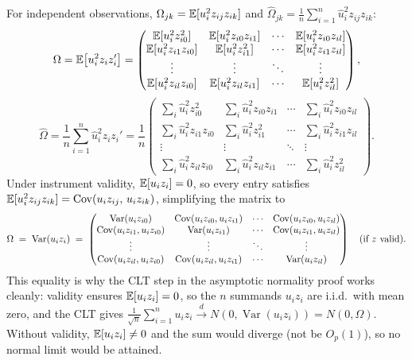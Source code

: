 \begin{remark}
	For independent observations, $\Omega_{jk}=\mathbb{E}[u_i^2 z_{ij}z_{ik}]$ and $\hat\Omega_{jk}=\frac{1}{n}\sum_{i=1}^n\hat u_i^2 z_{ij}z_{ik}$:
	\[
		\Omega = \mathbb{E}\!\left[u_i^2 z_iz_i'\right] =
		\begin{pmatrix}
			\mathbb{E}[u_i^2 z_{i0}^2]     & \mathbb{E}[u_i^2 z_{i0}z_{i1}] & \cdots & \mathbb{E}[u_i^2 z_{i0}z_{il}] \\
			\mathbb{E}[u_i^2 z_{i1}z_{i0}] & \mathbb{E}[u_i^2 z_{i1}^2]     & \cdots & \mathbb{E}[u_i^2 z_{i1}z_{il}] \\
			\vdots                  & \vdots                  & \ddots & \vdots                  \\
			\mathbb{E}[u_i^2 z_{il}z_{i0}] & \mathbb{E}[u_i^2 z_{il}z_{i1}] & \cdots & \mathbb{E}[u_i^2 z_{il}^2]
		\end{pmatrix},
	\]
	\[
		\hat\Omega = \frac{1}{n}\sum_{i=1}^n \hat u_i^2 z_iz_i' =
		\frac{1}{n}
		\begin{pmatrix}
			\textstyle\sum_i \hat u_i^2 z_{i0}^2     & \textstyle\sum_i \hat u_i^2 z_{i0}z_{i1} & \cdots & \textstyle\sum_i \hat u_i^2 z_{i0}z_{il} \\
			\textstyle\sum_i \hat u_i^2 z_{i1}z_{i0} & \textstyle\sum_i \hat u_i^2 z_{i1}^2     & \cdots & \textstyle\sum_i \hat u_i^2 z_{i1}z_{il} \\
			\vdots                                    & \vdots                                    & \ddots & \vdots                                   \\
			\textstyle\sum_i \hat u_i^2 z_{il}z_{i0} & \textstyle\sum_i \hat u_i^2 z_{il}z_{i1} & \cdots & \textstyle\sum_i \hat u_i^2 z_{il}^2
		\end{pmatrix}.
	\]
	Under instrument validity, $\mathbb{E}[u_iz_i]=0$, so every entry satisfies $\mathbb{E}[u_i^2 z_{ij}z_{ik}] = \operatorname{Cov}(u_iz_{ij},\,u_iz_{ik})$, simplifying the matrix to
	\[
		\Omega \;=\; \operatorname{Var}(u_i z_i) \;=\;
		\begin{pmatrix}
			\operatorname{Var}(u_iz_{i0})           & \operatorname{Cov}(u_iz_{i0},u_iz_{i1}) & \cdots & \operatorname{Cov}(u_iz_{i0},u_iz_{il}) \\
			\operatorname{Cov}(u_iz_{i1},u_iz_{i0}) & \operatorname{Var}(u_iz_{i1})           & \cdots & \operatorname{Cov}(u_iz_{i1},u_iz_{il}) \\
			\vdots                    & \vdots                    & \ddots & \vdots                    \\
			\operatorname{Cov}(u_iz_{il},u_iz_{i0}) & \operatorname{Cov}(u_iz_{il},u_iz_{i1}) & \cdots & \operatorname{Var}(u_iz_{il})
		\end{pmatrix}
		\quad\text{(if $z$ valid).}
	\]
	This equality is why the CLT step in the asymptotic normality proof works cleanly: validity ensures $\mathbb{E}[u_iz_i]=0$, so the $n$ summands $u_iz_i$ are i.i.d.\ with mean zero, and the CLT gives $\frac{1}{\sqrt{n}}\sum_{i=1}^n u_iz_i \xrightarrow{d} N(0,\operatorname{Var}(u_iz_i)) = N(0,\Omega)$.  Without validity, $\mathbb{E}[u_iz_i]\ne 0$ and the sum would diverge (not be $O_p(1)$), so no normal limit would be attained.


\end{remark}
